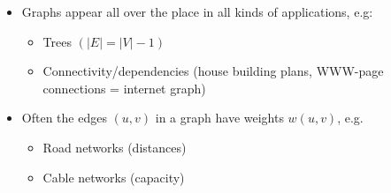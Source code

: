 \begin{itemize}
	\vspace*{\baselineskip}
	
	\item Graphs appear all over the place in all kinds of applications, e.g:
	\begin{itemize}
		\item Trees $(\vert E \vert = \vert V \vert - 1)$
		\item Connectivity/dependencies (house building plans, WWW-page
		connections = internet graph)
	\end{itemize}
	\item Often the edges $(u,v)$ in a graph have weights $w(u,v)$, e.g.
	\begin{itemize}
		\item Road networks (distances)
		\item Cable networks (capacity)
	\end{itemize}
\end{itemize}



